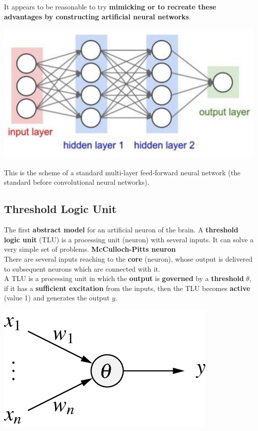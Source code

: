 \documentclass[11pt]{article}
\begin{document}
		It appears to be reasonable to try \textbf{mimicking or to recreate these advantages by constructing artificial neural networks}.
		\begin{center}
			\includegraphics[width=0.75\columnwidth]{img/NN/NN1}
		\end{center}
		This is the scheme of a standard multi-layer feed-forward neural network (the standard before convolutional neural networks).\\
		
		
		\newpage
		
		\subsection{Threshold Logic Unit}
		The first \textbf{abstract model} for an artificial neuron of the brain. A \textbf{threshold logic unit} (TLU) is a processing unit (neuron) with several inputs. It can solve a very simple set of problems. \textbf{McCulloch-Pitts neuron}\\
		
		There are several inputs reaching to the \textbf{core} (neuron), whose output is delivered to subsequent neurons which are connected with it.\\
		
		A TLU is a processing unit in which the \textbf{output} is \textbf{governed} by a \textbf{threshold} $\theta$, if it has a \textbf{sufficient excitation} from the inputs, then the TLU becomes \textbf{active} (value 1) and generates the output $y$.
		
		\begin{center}
			\includegraphics[width=0.35\columnwidth]{img/NN/TLU1}
		\end{center}
		
\end{document}
